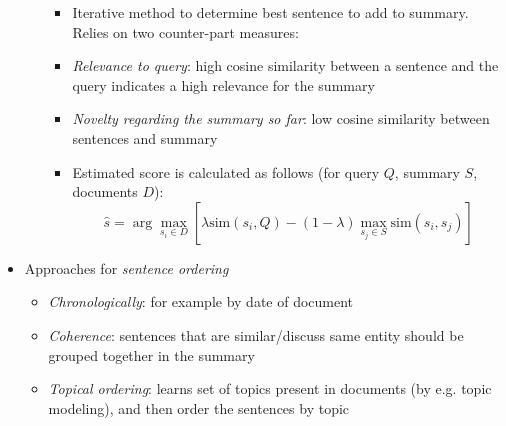 \begin{itemize}
\begin{itemize}
\begin{itemize}
			\item Iterative method to determine best sentence to add to summary. Relies on two counter-part measures:
			\item \textit{Relevance to query}: high cosine similarity between a sentence and the query indicates a high relevance for the summary
			\item \textit{Novelty regarding the summary so far}: low cosine similarity between sentences and summary
			\item Estimated score is calculated as follows (for query $Q$, summary $S$, documents $D$):
			$$\hat{s} = \arg\max_{s_i \in D} \left[\lambda \text{sim}\left(s_i, Q\right) - \left(1 - \lambda\right)\max_{s_j \in S}\text{sim}\left(s_i, s_j\right)\right]$$
		\end{itemize}
	\end{itemize}
	\item Approaches for \textit{sentence ordering}
	\begin{itemize}
		\item \textit{Chronologically}: for example by date of document
		\item \textit{Coherence}: sentences that are similar/discuss same entity should be grouped together in the summary
		\item \textit{Topical ordering}: learns set of topics present in documents (by e.g. topic modeling), and then order the sentences by topic
	\end{itemize}
\end{itemize}
